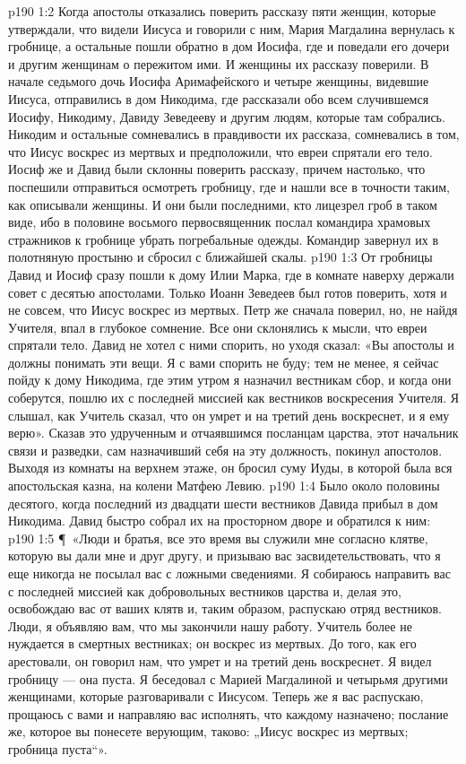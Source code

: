 \vs p190 1:2 Когда апостолы отказались поверить рассказу пяти женщин, которые утверждали, что видели Иисуса и говорили с ним, Мария Магдалина вернулась к гробнице, а остальные пошли обратно в дом Иосифа, где и поведали его дочери и другим женщинам о пережитом ими. И женщины их рассказу поверили. В начале седьмого дочь Иосифа Аримафейского и четыре женщины, видевшие Иисуса, отправились в дом Никодима, где рассказали обо всем случившемся Иосифу, Никодиму, Давиду Зеведееву и другим людям, которые там собрались. Никодим и остальные сомневались в правдивости их рассказа, сомневались в том, что Иисус воскрес из мертвых и предположили, что евреи спрятали его тело. Иосиф же и Давид были склонны поверить рассказу, причем настолько, что поспешили отправиться осмотреть гробницу, где и нашли все в точности таким, как описывали женщины. И они были последними, кто лицезрел гроб в таком виде, ибо в половине восьмого первосвященник послал командира храмовых стражников к гробнице убрать погребальные одежды. Командир завернул их в полотняную простыню и сбросил с ближайшей скалы.
\vs p190 1:3 От гробницы Давид и Иосиф сразу пошли к дому Илии Марка, где в комнате наверху держали совет с десятью апостолами. Только Иоанн Зеведеев был готов поверить, хотя и не совсем, что Иисус воскрес из мертвых. Петр же сначала поверил, но, не найдя Учителя, впал в глубокое сомнение. Все они склонялись к мысли, что евреи спрятали тело. Давид не хотел с ними спорить, но уходя сказал: «Вы апостолы и должны понимать эти вещи. Я с вами спорить не буду; тем не менее, я сейчас пойду к дому Никодима, где этим утром я назначил вестникам сбор, и когда они соберутся, пошлю их с последней миссией как вестников воскресения Учителя. Я слышал, как Учитель сказал, что он умрет и на третий день воскреснет, и я ему верю». Сказав это удрученным и отчаявшимся посланцам царства, этот начальник связи и разведки, сам назначивший себя на эту должность, покинул апостолов. Выходя из комнаты на верхнем этаже, он бросил суму Иуды, в которой была вся апостольская казна, на колени Матфею Левию.
\vs p190 1:4 Было около половины десятого, когда последний из двадцати шести вестников Давида прибыл в дом Никодима. Давид быстро собрал их на просторном дворе и обратился к ним:
\vs p190 1:5 \P\ «Люди и братья, все это время вы служили мне согласно клятве, которую вы дали мне и друг другу, и призываю вас засвидетельствовать, что я еще никогда не посылал вас с ложными сведениями. Я собираюсь направить вас с последней миссией как добровольных вестников царства и, делая это, освобождаю вас от ваших клятв и, таким образом, распускаю отряд вестников. Люди, я объявляю вам, что мы закончили нашу работу. Учитель более не нуждается в смертных вестниках; он воскрес из мертвых. До того, как его арестовали, он говорил нам, что умрет и на третий день воскреснет. Я видел гробницу --- она пуста. Я беседовал с Марией Магдалиной и четырьмя другими женщинами, которые разговаривали с Иисусом. Теперь же я вас распускаю, прощаюсь с вами и направляю вас исполнять, что каждому назначено; послание же, которое вы понесете верующим, таково: „Иисус воскрес из мертвых; гробница пуста“».
